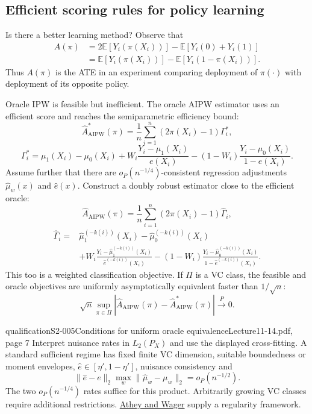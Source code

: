 \subsection{Efficient scoring rules for policy learning}
Is there a better learning method? Observe that
\begin{align*}
 A(\pi)&=2\mathbb E[Y_i(\pi(X_i))]-\mathbb E[Y_i(0)+Y_i(1)]\\
 &=\mathbb E[Y_i(\pi(X_i))]-\mathbb E[Y_i(1-\pi(X_i))].
\end{align*}
Thus $A(\pi)$ is the ATE in an experiment comparing deployment of $\pi(\cdot)$ with deployment of its opposite policy.

Oracle IPW is feasible but inefficient. The oracle AIPW estimator uses an efficient score and reaches the semiparametric efficiency bound:
\[
 \widehat A^*_{\mathrm{AIPW}}(\pi)
 =\frac1n\sum_{i=1}^n(2\pi(X_i)-1)\Gamma_i^*,
\]
\[
 \Gamma_i^*=\mu_1(X_i)-\mu_0(X_i)
 +W_i\frac{Y_i-\mu_1(X_i)}{e(X_i)}
 -(1-W_i)\frac{Y_i-\mu_0(X_i)}{1-e(X_i)}.
\]
Assume further that there are $o_P(n^{-1/4})$-consistent regression adjustments $\widehat\mu_w(x)$ and $\widehat e(x)$.  Construct a doubly robust estimator close to the efficient oracle:
\[
 \widehat A_{\mathrm{AIPW}}(\pi)
 =\frac1n\sum_{i=1}^n(2\pi(X_i)-1)\widehat\Gamma_i,
\]
\begin{align*}
 \widehat\Gamma_i={}&\widehat\mu_1^{(-k(i))}(X_i)
 -\widehat\mu_0^{(-k(i))}(X_i)\\
 &+W_i\frac{Y_i-\widehat\mu_1^{(-k(i))}(X_i)}
 {\widehat e^{(-k(i))}(X_i)}
 -(1-W_i)\frac{Y_i-\widehat\mu_0^{(-k(i))}(X_i)}
 {1-\widehat e^{(-k(i))}(X_i)}.
\end{align*}
This too is a weighted classification objective. If $\Pi$ is a VC class, the feasible and oracle objectives are uniformly asymptotically equivalent faster than $1/\sqrt n$:
\[
 \sqrt n\sup_{\pi\in\Pi}
 \left|\widehat A_{\mathrm{AIPW}}(\pi)
 -\widehat A^*_{\mathrm{AIPW}}(\pi)\right|
 \xrightarrow{P}0.\tag{11.17}
\]

\begin{reviewnote}{qualification}{S2-005}{Conditions for uniform oracle equivalence}{Lecture11-14.pdf, page 7}
Interpret nuisance rates in $L_2(P_X)$ and use the displayed cross-fitting. A standard sufficient regime has fixed finite VC dimension, suitable boundedness or moment envelopes, $\widehat e\in[\eta',1-\eta']$, nuisance consistency and
\[
 \|\widehat e-e\|_2\max_w\|\widehat\mu_w-\mu_w\|_2=o_P(n^{-1/2}).
\]
The two $o_P(n^{-1/4})$ rates suffice for this product. Arbitrarily growing VC classes require additional restrictions. \href{https://arxiv.org/abs/1702.02896}{Athey and Wager} supply a regularity framework.
\end{reviewnote}


